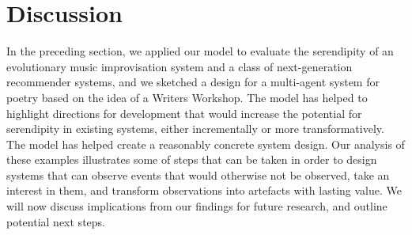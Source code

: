 
\section{Discussion} \label{sec:discussion}

In the preceding section, we applied our model to evaluate the serendipity of an evolutionary music improvisation system and a class of next-generation recommender systems, and we sketched a design for a multi-agent system for poetry based on the idea of a Writers Workshop.  The model has helped to highlight directions for development that would increase the potential for serendipity in existing systems, either incrementally or more transformatively.  The model has helped create a reasonably concrete system design.  Our analysis of these examples illustrates some of steps that can be taken in order to design systems that can observe events that would otherwise not be observed, take an interest in them, and transform observations into artefacts with lasting value.  We will now discuss implications from our findings for future research, and outline potential next steps.




